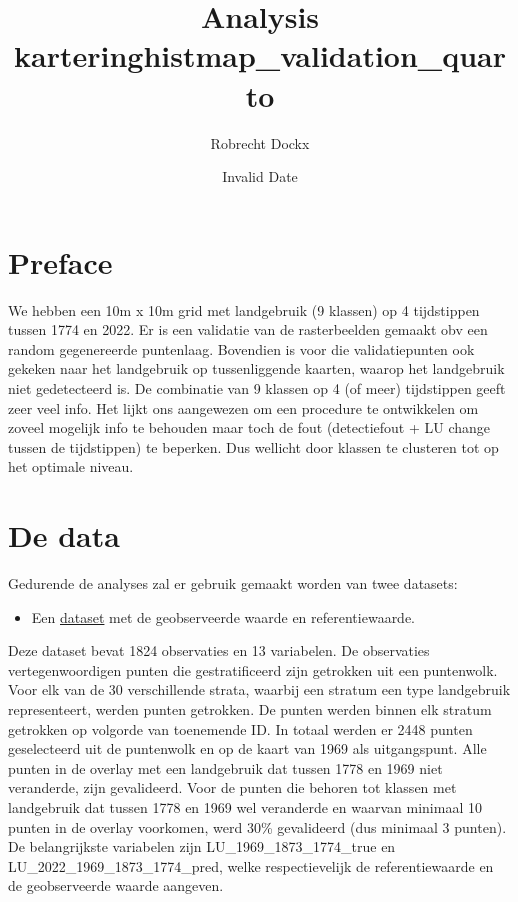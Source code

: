 \documentclass[twoside]{extreport}
\title{Analysis kartering}
\title{histmap\_validation\_quarto}
\author{Robrecht Dockx}
\date{Invalid Date}
\providecommand{\tightlist}{%
  \setlength{\itemsep}{0pt}\setlength{\parskip}{0pt}}\usepackage{longtable,booktabs,array}
\begin{document}
\maketitle



\chapter*{Preface}\label{preface}


We hebben een 10m x 10m grid met landgebruik (9 klassen) op 4
tijdstippen tussen 1774 en 2022. Er is een validatie van de
rasterbeelden gemaakt obv een random gegenereerde puntenlaag. Bovendien
is voor die validatiepunten ook gekeken naar het landgebruik op
tussenliggende kaarten, waarop het landgebruik niet gedetecteerd is. De
combinatie van 9 klassen op 4 (of meer) tijdstippen geeft zeer veel
info. Het lijkt ons aangewezen om een procedure te ontwikkelen om zoveel
mogelijk info te behouden maar toch de fout (detectiefout + LU change
tussen de tijdstippen) te beperken. Dus wellicht door klassen te
clusteren tot op het optimale niveau.


\chapter{De data}\label{de-data}

Gedurende de analyses zal er gebruik gemaakt worden van twee datasets:

\begin{itemize}
\tightlist
\item
  Een
  \href{https://docs.google.com/spreadsheets/d/1Qk7hgajuzkvmWGGcqCOz3KUxLxcIr0KE/edit?gid=1736581617\#gid=1736581617}{dataset}
  met de geobserveerde waarde en referentiewaarde.
\end{itemize}

Deze dataset bevat 1824 observaties en 13 variabelen. De observaties
vertegenwoordigen punten die gestratificeerd zijn getrokken uit een
puntenwolk. Voor elk van de 30 verschillende strata, waarbij een stratum
een type landgebruik representeert, werden punten getrokken. De punten
werden binnen elk stratum getrokken op volgorde van toenemende ID. In
totaal werden er 2448 punten geselecteerd uit de puntenwolk en op de
kaart van 1969 als uitgangspunt. Alle punten in de overlay met een
landgebruik dat tussen 1778 en 1969 niet veranderde, zijn gevalideerd.
Voor de punten die behoren tot klassen met landgebruik dat tussen 1778
en 1969 wel veranderde en waarvan minimaal 10 punten in de overlay
voorkomen, werd 30\% gevalideerd (dus minimaal 3 punten). De
belangrijkste variabelen zijn LU\_1969\_1873\_1774\_true en
LU\_2022\_1969\_1873\_1774\_pred, welke respectievelijk de
referentiewaarde en de geobserveerde waarde aangeven.
\end{document}
